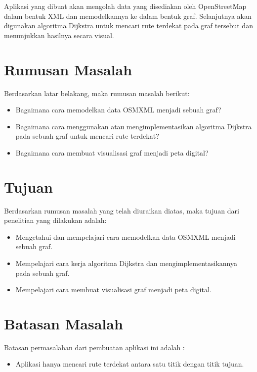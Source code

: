 Aplikasi yang dibuat akan mengolah data yang disediakan oleh OpenStreetMap dalam bentuk XML dan 
memodelkannya ke dalam bentuk graf. Selanjutnya akan digunakan algoritma Dijkstra untuk mencari 
rute terdekat pada graf tersebut dan menunjukkan hasilnya secara visual.

\section{Rumusan Masalah}
Berdasarkan latar belakang, maka rumusan masalah berikut: 
\begin{itemize}
	\item Bagaimana cara memodelkan data OSMXML menjadi sebuah graf?
	\item Bagaimana cara menggunakan atau mengimplementasikan algoritma Dijkstra
	pada sebuah graf untuk mencari rute terdekat?
	\item Bagaimana cara membuat visualisasi graf menjadi peta digital?
\end{itemize}

\section{Tujuan}
Berdasarkan rumusan masalah yang telah diuraikan diatas, maka tujuan dari penelitian yang dilakukan
adalah:
\begin{itemize} 
	\item Mengetahui dan mempelajari cara memodelkan data OSMXML menjadi sebuah
	graf.
	\item Mempelajari cara kerja algoritma Dijkstra dan	mengimplementasikannya pada
	sebuah graf.
 	\item Mempelajari cara membuat visualisasi graf menjadi peta digital. 
 \end{itemize}

\section{Batasan Masalah}
Batasan permasalahan dari pembuatan aplikasi ini adalah :
\begin{itemize}
	\item Aplikasi hanya mencari rute terdekat antara satu titik dengan titik
	tujuan.
\end{itemize}


